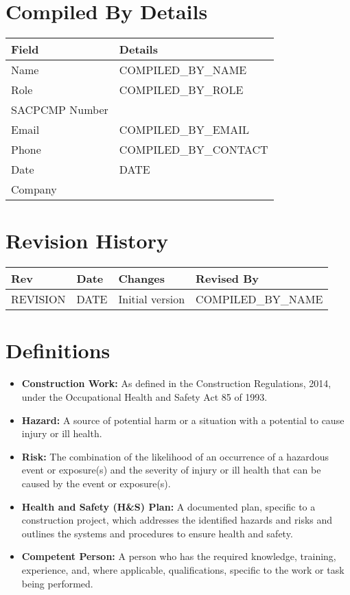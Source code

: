 \documentclass[11pt]{article}
\newcommand{\issueDate}{{{DATE}}}
\newcommand{\compilerName}{{{COMPILED_BY_NAME}}}
\newcommand{\compilerRole}{{{COMPILED_BY_ROLE}}}
\newcommand{\compilerSACPCMP}{}
\newcommand{\compilerEmail}{{{COMPILED_BY_EMAIL}}}
\newcommand{\compilerPhone}{{{COMPILED_BY_CONTACT}}}
\newcommand{\compilerCompany}{}
\newcommand{\revision}{{{REVISION}}}
\begin{document}
\section{Compiled By Details}
\begin{tabularx}{\textwidth}{lX}
  \toprule
  \textbf{Field} & \textbf{Details} \\
  \midrule
  Name & \compilerName \\
  Role & \compilerRole \\
  SACPCMP Number & \compilerSACPCMP \\
  Email & \compilerEmail \\
  Phone & \compilerPhone \\
  Date & \issueDate \\
  Company & \compilerCompany \\
  \bottomrule
\end{tabularx}

\section{Revision History}
\begin{tabularx}{\textwidth}{lXll}
  \toprule
  \textbf{Rev} & \textbf{Date} & \textbf{Changes} & \textbf{Revised By} \\
  \midrule
  \revision & \issueDate & Initial version & \compilerName \\
  \bottomrule
\end{tabularx}

\section{Definitions}
\begin{itemize}
    \item \textbf{Construction Work:} As defined in the Construction Regulations, 2014, under the Occupational Health and Safety Act 85 of 1993.
    \item \textbf{Hazard:} A source of potential harm or a situation with a potential to cause injury or ill health.
    \item \textbf{Risk:} The combination of the likelihood of an occurrence of a hazardous event or exposure(s) and the severity of injury or ill health that can be caused by the event or exposure(s).
    \item \textbf{Health and Safety (H\&S) Plan:} A documented plan, specific to a construction project, which addresses the identified hazards and risks and outlines the systems and procedures to ensure health and safety.
    \item \textbf{Competent Person:} A person who has the required knowledge, training, experience, and, where applicable, qualifications, specific to the work or task being performed.
\end{itemize}
\end{document}
